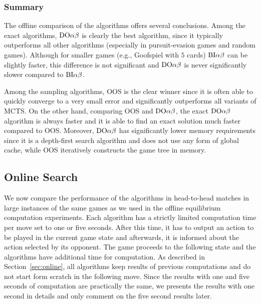 \subsubsection{Summary}

The offline comparison of the algorithms offers several conclusions.
Among the exact algorithms, $\textrm{DO}\alpha\beta$ is clearly the best algorithm, since it typically outperforms all other algorithms (especially in pursuit-evasion games and random games). Although for smaller games (e.g., Goofspiel with $5$ cards)  $\textrm{BI}\alpha\beta$ can be slightly faster, this difference is not significant and $\textrm{DO}\alpha\beta$ is never significantly slower compared to $\textrm{BI}\alpha\beta$.

Among the sampling algorithms, OOS is the clear winner since it is often able to quickly converge to a very small error and significantly outperforms all variants of MCTS.
On the other hand, comparing OOS and $\textrm{DO}\alpha\beta$, the exact $\textrm{DO}\alpha\beta$ algorithm is always faster and it is able to find an exact solution much faster compared to OOS.
Moreover, $\textrm{DO}\alpha\beta$ has significantly lower memory requirements since it is a depth-first search algorithm and does not use any form of global cache, while OOS iteratively constructs the game tree in memory.


\subsection{Online Search}

We now compare the performance of the algorithms in head-to-head matches in large instances of the same games as we used in the offline equilibrium computation experiments. Each algorithm has a strictly limited computation time per move set to one or five seconds. After this time, it has to output an action to be played in the current game state and afterwards, it is informed about the action selected by its opponent. The game proceeds to the following state and the algorithms have additional time for computation. As described in Section~\ref{sec:online}, all algorithms keep results of previous computations and do not start form scratch in the following move. Since the results with one and five seconds of computation are practically the same, we presents the results with one second in details and only comment on the five second results later.

